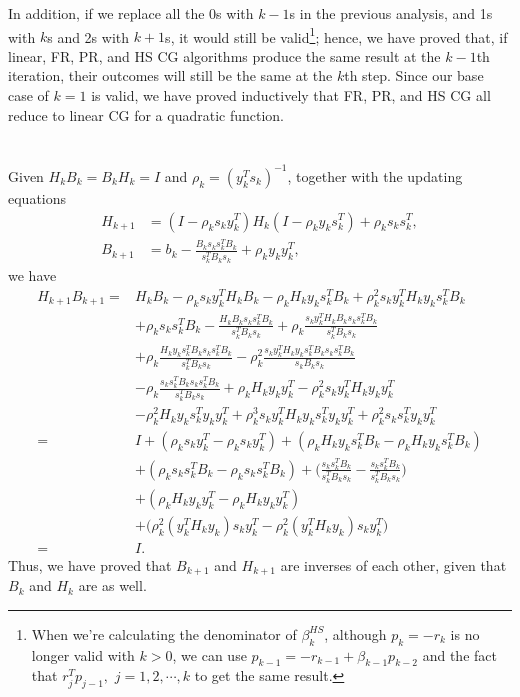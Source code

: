 \documentclass[11pt]{article}
\begin{document}
In addition, if we replace all the 0s with $k-1$s in the previous analysis, and 1s with $k$s and 2s with $k+1$s, it would still be valid\footnote{When we're calculating the denominator of $\beta^{HS}_k$, although $p_k=-r_k$ is no longer valid with $k>0$, we can use $p_{k-1} = -r_{k-1} + \beta_{k-1}p_{k-2}$ and the fact that $r_{j}^Tp_{j-1},\,\,j = 1, 2, \cdots, k$ to get the same result.}; hence, we have proved that, if linear, FR, PR, and HS CG algorithms produce the same result at the ${k-1}$th iteration, their outcomes will still be the same at the $k$th step. Since our base case of $k=1$ is valid, we have proved inductively that FR, PR, and HS CG all reduce to linear CG for a quadratic function. 

\section{}
Given $H_kB_k = B_kH_k=I$ and $\rho_k = (y_k^Ts_k)^{-1}$, together with the updating equations
\begin{equation}\begin{split} 
H_{k+1} &= (I-\rho_k s_k y_k^T )H_k(I-\rho_ky_ks_k^T) + \rho_ks_ks_k^T,\\
B_{k+1} &=b_k - \frac{B_ks_ks_k^TB_k}{s_k^TB_ks_k} + \rho_ky_ky_k^T,
\end{split}\nonumber\end{equation} 
we have 
\begin{equation}\begin{split} 
H_{k+1}B_{k+1} =& H_kB_k -\rho_ks_ky_k^TH_kB_k - \rho_kH_ky_ks_k^TB_k + \rho_k^2s_ky_k^TH_ky_ks_k^TB_k \\
& +\rho_ks_ks_k^TB_k-\frac{H_kB_ks_ks_k^TB_k}{s_k^TB_ks_k} + \rho_k\frac{s_ky_k^TH_kB_ks_ks_k^TB_k}{s_k^TB_ks_k}\\
&+\rho_k\frac{H_ky_ks_k^TB_ks_ks_k^TB_k}{s_k^TB_ks_k} -\rho_k^2\frac{s_ky_k^TH_ky_ks_k^TB_ks_ks_k^TB_k}{s_kB_ks_k}\\
&-\rho_k\frac{s_ks_k^TB_ks_ks_k^TB_k}{s_k^TB_ks_k}+\rho_kH_ky_ky_k^T-\rho_k^2s_ky_k^TH_ky_ky_k^T \\
&- \rho_k^2H_ky_ks_k^Ty_ky_k^T + \rho_k^3s_ky_k^TH_ky_ks_k^Ty_ky_k^T + \rho_k^2s_ks_k^Ty_ky_k^T \\
=&I + (\rho_ks_ky_k^T - \rho_ks_ky_k^T) + (\rho_kH_ky_ks_k^TB_k-\rho_kH_ky_ks_k^TB_k) \\
& +(\rho_ks_ks_k^TB_k - \rho_ks_ks_k^TB_k) + \Big(\frac{s_ks_k^TB_k}{s_k^TB_ks_k}-\frac{s_ks_k^TB_k}{s_k^TB_ks_k} \Big) \\
& + (\rho_kH_ky_ky_k^T - \rho_kH_ky_ky_k^T) \\
& + \Big( \rho_k^2(y_k^TH_ky_k)s_ky_k^T - \rho_k^2(y_k^TH_ky_k)s_ky_k^T \Big) \\
=&I.
\end{split}\nonumber\end{equation} 
Thus, we have proved that $B_{k+1}$ and $H_{k+1}$ are inverses of each other, given that $B_k$ and $H_k$ are as well.
\end{document}
